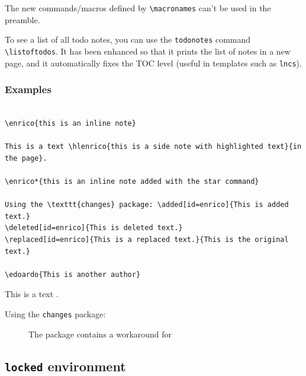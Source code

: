 \documentclass[a4paper]{article}
\newcommand\B[1]{\texttt{\textbackslash #1}}
\begin{document}
The new commands/macros defined by \B{macronames} can't be used in the preamble.

To see a list of all todo notes, you can use the \texttt{todonotes} command \B{listoftodos}. It has been enhanced so that it prints the list of notes in a new page, and it automatically fixes the TOC level (useful in templates such as \texttt{lncs}).

\subsubsection{Examples}

\begin{verbatim}

\enrico{this is an inline note}

This is a text \hlenrico{this is a side note with highlighted text}{in the page}.

\enrico*{this is an inline note added with the star command}

Using the \texttt{changes} package: \added[id=enrico]{This is added text.}
\deleted[id=enrico]{This is deleted text.}
\replaced[id=enrico]{This is a replaced text.}{This is the original text.}

\edoardo{This is another author}

\end{verbatim}


This is a text .


Using the \texttt{changes} package: 


\begin{figure}
\centering
\caption{The package contains a workaround for }
\end{figure}



\subsection{\texttt{locked} environment}
\end{document}
